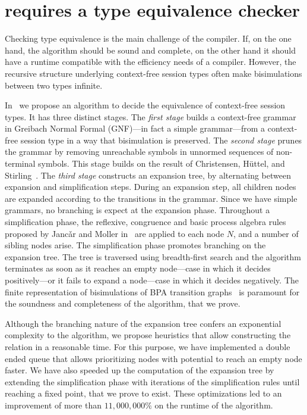 \section{\freest{} requires a type equivalence checker}
\label{sec:equivalence}

Checking type equivalence is the main challenge of the
compiler. If, on the one hand, the algorithm should be sound and 
complete, on the other hand it should have a runtime compatible
with the efficiency needs of a compiler.
However, the recursive structure underlying context-free 
session types often make bisimulations between two types infinite. 

In~\cite{typeEquivalence} we propose an algorithm to decide
the equivalence of context-free session types. 
It has three distinct stages.
%
The \emph{first stage} builds a context-free grammar in Greibach
Normal Formal (GNF)---in fact a simple grammar---from a context-free
session type in a way that bisimulation is preserved.  
%
The \emph{second stage} prunes the grammar by removing unreachable
symbols in unnormed sequences of non-terminal symbols. This stage
builds on the result of Christensen, H\"uttel, and 
Stirling~\cite{DBLP:journals/iandc/ChristensenHS95}.
%
The \emph{third stage} constructs an expansion tree, by alternating
between expansion and simplification steps. During an expansion step, 
all children nodes are expanded according to the transitions in the 
grammar. Since we have simple grammars, no branching is expect at the
expansion phase. Throughout a simplification phase, the reflexive, 
congruence and basic process algebra
rules proposed by Janc\v ar and Moller in~\cite{janvcar1999techniques}
are applied to each node $N$, and a number of sibling nodes arise.
The simplification phase promotes branching on the expansion tree.
The tree is traversed using breadth-first search and the 
algorithm terminates as soon as it reaches an empty node---case
in which it decides positively---or it fails to expand a node---case
in which it decides negatively.  
The finite representation of bisimulations of BPA transition
graphs~\cite{caucal1986decidabilite, DBLP:journals/iandc/ChristensenHS95} 
is paramount for the soundness and completeness of the algorithm,
that we prove. 

Although the branching nature of the expansion tree confers an exponential 
complexity to the algorithm, we propose heuristics that allow constructing 
the relation in a reasonable time. For this purpose, we have implemented a
double ended queue that allows prioritizing nodes with potential to reach
an empty node faster. 
We have also speeded up the computation of the expansion
tree by extending the simplification phase with iterations of the 
simplification rules until reaching a fixed point, that we prove to exist.
These optimizations led to an improvement of more than $11,000,000\%$
on the runtime of the algorithm.

